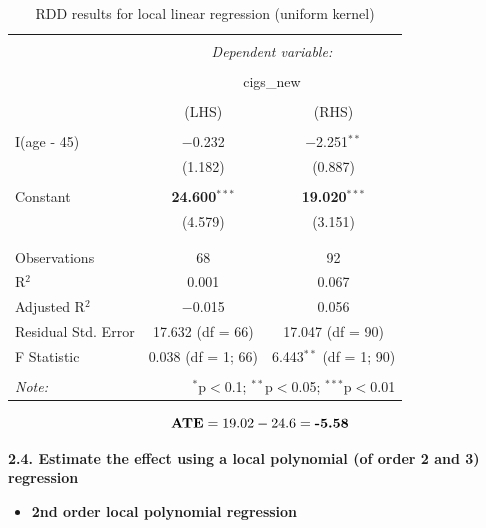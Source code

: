 \documentclass[a4paper]{article}
\begin{document}
\begin{table}[!htbp] \centering 
	\caption{RDD results for local linear regression (uniform kernel)} 
	\label{} 
	\begin{tabular}{@{\extracolsep{5pt}}lcc} 
		\\[-1.8ex]\hline 
		\hline \\[-1.8ex] 
		& \multicolumn{2}{c}{\textit{Dependent variable:}} \\ 
		\cline{2-3} 
		\\[-1.8ex] & \multicolumn{2}{c}{cigs\_new} \\ 
		\\[-1.8ex] & (LHS) & (RHS)\\ 
		\hline \\[-1.8ex] 
		I(age - 45) & $-$0.232 & $-$2.251$^{**}$ \\ 
		& (1.182) & (0.887) \\ 
		& & \\ 
		Constant & \textbf{24.600}$^{***}$ & \textbf{19.020}$^{***}$ \\ 
		& (4.579) & (3.151) \\ 
		& & \\ 
		\hline \\[-1.8ex] 
		Observations & 68 & 92 \\ 
		R$^{2}$ & 0.001 & 0.067 \\ 
		Adjusted R$^{2}$ & $-$0.015 & 0.056 \\ 
		Residual Std. Error & 17.632 (df = 66) & 17.047 (df = 90) \\ 
		F Statistic & 0.038 (df = 1; 66) & 6.443$^{**}$ (df = 1; 90) \\ 
		\hline 
		\hline \\[-1.8ex] 
		\textit{Note:}  & \multicolumn{2}{r}{$^{*}$p$<$0.1; $^{**}$p$<$0.05; $^{***}$p$<$0.01} \\ 
	\end{tabular} 
\end{table} 

\begin{equation}
\text{\textbf{ATE}} = 19.02 - 24.6 = \textbf{-5.58}
\end{equation}

\textbf{2.4. Estimate the effect using a local polynomial (of order 2 and 3) regression}

\begin{itemize}
	\item  \textbf{2nd order local polynomial regression }
\end{itemize}
\end{document}
